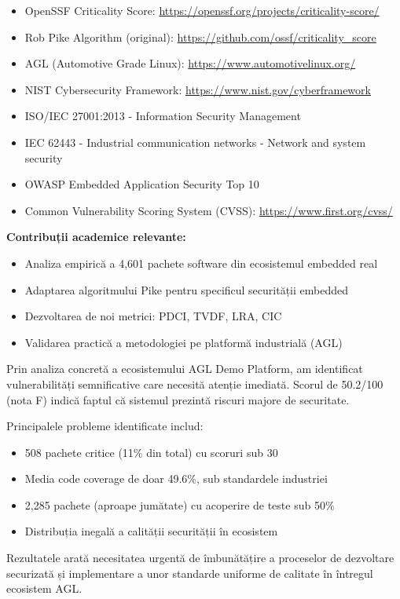\documentclass[12pt,a4paper]{article}
\begin{document}
\begin{itemize}
\item OpenSSF Criticality Score: \url{https://openssf.org/projects/criticality-score/}
\item Rob Pike Algorithm (original): \url{https://github.com/ossf/criticality_score}
\item AGL (Automotive Grade Linux): \url{https://www.automotivelinux.org/}
\item NIST Cybersecurity Framework: \url{https://www.nist.gov/cyberframework}
\item ISO/IEC 27001:2013 - Information Security Management
\item IEC 62443 - Industrial communication networks - Network and system security
\item OWASP Embedded Application Security Top 10
\item Common Vulnerability Scoring System (CVSS): \url{https://www.first.org/cvss/}
\end{itemize}

\textbf{Contribuții academice relevante:}
\begin{itemize}
\item Analiza empirică a 4,601 pachete software din ecosistemul embedded real
\item Adaptarea algoritmului Pike pentru specificul securității embedded
\item Dezvoltarea de noi metrici: PDCI, TVDF, LRA, CIC
\item Validarea practică a metodologiei pe platformă industrială (AGL)
\end{itemize}

Prin analiza concretă a ecosistemului AGL Demo Platform, am identificat vulnerabilități semnificative care necesită atenție imediată. Scorul de 50.2/100 (nota F) indică faptul că sistemul prezintă riscuri majore de securitate.

Principalele probleme identificate includ:
\begin{itemize}
\item 508 pachete critice (11\% din total) cu scoruri sub 30
\item Media code coverage de doar 49.6\%, sub standardele industriei
\item 2,285 pachete (aproape jumătate) cu acoperire de teste sub 50\%
\item Distribuția inegală a calității securității în ecosistem
\end{itemize}

Rezultatele arată necesitatea urgentă de îmbunătățire a proceselor de dezvoltare securizată și implementare a unor standarde uniforme de calitate în întregul ecosistem AGL.
\end{document}
